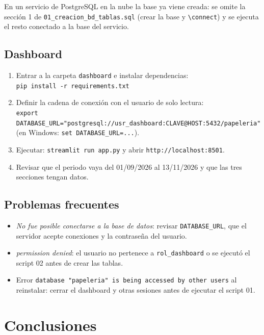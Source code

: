 \documentclass[12pt,a4paper]{article}
\newcommand{\cod}[1]{{\ttfamily\nolinkurl{#1}}}
\begin{document}
En un servicio de PostgreSQL en la nube la base ya viene creada: se omite la
sección 1 de \cod{01_creacion_bd_tablas.sql} (crear la base y \texttt{\small\textbackslash connect}) y se
ejecuta el resto conectado a la base del servicio.

\subsection{Dashboard}

\begin{enumerate}[label=$\square$ \arabic*., leftmargin=1.4cm, itemsep=0.35em]
\item Entrar a la carpeta \cod{dashboard} e instalar dependencias:\\
\cod{pip install -r requirements.txt}
\item Definir la cadena de conexión con el usuario de solo lectura:\\
\cod{export DATABASE_URL="postgresql://usr_dashboard:CLAVE@HOST:5432/papeleria"}\\
(en Windows: \cod{set DATABASE_URL=...}).
\item Ejecutar: \cod{streamlit run app.py} y abrir \cod{http://localhost:8501}.
\item Revisar que el periodo vaya del 01/09/2026 al 13/11/2026 y que las tres
secciones tengan datos.
\end{enumerate}

\subsection{Problemas frecuentes}

\begin{itemize}[leftmargin=1.2cm, itemsep=0.2em]
\item \textit{No fue posible conectarse a la base de datos}: revisar
\cod{DATABASE_URL}, que el servidor acepte conexiones y la contraseña del usuario.
\item \textit{permission denied}: el usuario no pertenece a \cod{rol_dashboard} o
se ejecutó el script 02 antes de crear las tablas.
\item Error \cod{database "papeleria" is being accessed by other users} al
reinstalar: cerrar el dashboard y otras sesiones antes de ejecutar el script 01.
\end{itemize}

\section{Conclusiones}
\end{document}
